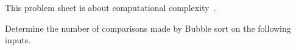 \documentclass[addpoints,12pt]{exam}
\begin{document}
\noindent
This problem sheet is about computational complexity~\cite{sipserbook}.

\begin{questions}

\question
Determine the number of comparisons made by Bubble sort on the following inputs.
\begin{parts}
  \part $[3,2,1]$
  \part $[4,3,2,1]$
  \part $[5,4,3,2,1]$
  \part $[6,5,4,3,2,1]$
  \part $[20,19,18,\ldots,3,2,1]$
  \part $[3,4,5,2,1]$
  \part $[4,5,1,2,3]$
\end{parts}
\begin{solution}
\end{solution}
\end{questions}
\end{document}
